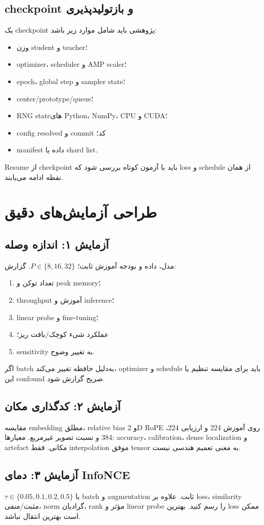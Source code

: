 \documentclass[12pt,openany,oneside]{book}
\begin{document}
\subsection{checkpoint و بازتولیدپذیری}
یک checkpoint پژوهشی باید شامل موارد زیر باشد:
\begin{itemize}
\item وزن student و teacher؛
\item optimizer، scheduler و AMP scaler؛
\item epoch، global step و sampler state؛
\item center/prototype/queue؛
\item RNG stateهای Python، NumPy، CPU و CUDA؛
\item config resolved و commit کد؛
\item manifest داده یا shard list.
\end{itemize}
Resume از checkpoint باید با آزمون کوتاه بررسی شود که loss و schedule از همان نقطه ادامه می‌یابند.

\section{طراحی آزمایش‌های دقیق}
\subsection{آزمایش ۱: اندازه وصله}
مدل، داده و بودجه آموزش ثابت؛ $P\in\{8,16,32\}$. گزارش:
\begin{enumerate}
\item تعداد توکن و peak memory؛
\item throughput آموزش و inference؛
\item linear probe و fine-tuning؛
\item عملکرد شیء کوچک/بافت ریز؛
\item sensitivity به تغییر وضوح.
\end{enumerate}
اگر batch به‌دلیل حافظه تغییر می‌کند، optimizer و schedule باید برای مقایسه تنظیم یا این confound صریح گزارش شود.

\subsection{آزمایش ۲: کدگذاری مکان}
مقایسه embedding مطلق، relative bias و 2D RoPE روی آموزش 224 و ارزیابی 224، 384 و نسبت تصویر غیرمربع. معیارها: accuracy، calibration، dense localization و artefact مکانی. فقط interpolation موفق tensor به معنی تعمیم هندسی نیست.

\subsection{آزمایش ۳: دمای InfoNCE}
$\tau\in\{0.05,0.1,0.2,0.5\}$ با batch و augmentation ثابت. علاوه بر loss، similarity مثبت/منفی، norm گرادیان، rank مؤثر و linear probe را رسم کنید. بهترین loss ممکن است بهترین انتقال نباشد.
\end{document}

